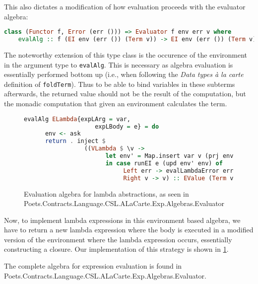 \documentclass[10pt,a4paper,final,oneside,openany,article]{memoir}
\begin{document}
This also dictates a modification of how evaluation proceeds with
the evaluator algebra:
\begin{lstlisting}[language=Haskell]
class (Functor f, Error (err ())) => Evaluator f env err v where
    evalAlg :: f (EI env (err ()) (Term v)) -> EI env (err ()) (Term v)
\end{lstlisting}
The noteworthy extension of this type class is the occurence of the
environment in the argument type to \lstinline{evalAlg}. This is
necessary as algebra evaluation is essentially performed bottom up
(i.e., when following the \textit{Data types à la carte} definition of
\lstinline{foldTerm}). Thus to be able to bind variables in these
subterms afterwards, the returned value should not be the result of
the computation, but the monadic computation that given an environment
calculates the term.


\begin{figure}
  \begin{lstlisting}[language=Haskell]
    evalAlg ELambda{expLArg = var,
                    expLBody = e} = do
      env <- ask
      return . inject $
                 ((VLambda $ \v ->
                       let env' = Map.insert var v (prj env)
                       in case runEI e (upd env' env) of
                            Left err -> evalLambdaError err
                            Right v -> v) :: EValue (Term v) (Term v))
  \end{lstlisting}
  \caption{Evaluation algebra for lambda abstractions, as seen in
    Poets.Contracts.Language.CSL.ALaCarte.Exp.Algebras.Evaluator}
  \label{fig:eval_lambda}
\end{figure}
Now, to implement lambda expressions in this environment based
algebra, we have to return a new lambda expression where the body is
executed in a modified version of the environment where the lambda
expression occurs, essentially constructing a closure. Our
implementation of this strategy is shown in \ref{fig:eval_lambda}.

The complete algebra for expression evaluation is found in 
Poets.Contracts.Language.CSL.ALaCarte.Exp.Algebras.Evaluator.
\end{document}
